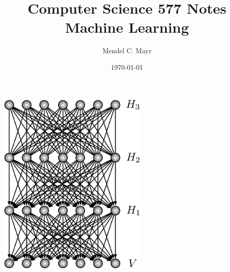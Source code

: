 \documentclass{article}
\title{Computer Science 577 Notes \\ Machine Learning}
\author{Mendel C. Mayr}
\date{\today}
\begin{document}
	\maketitle
	\vspace{10pt}
	\begin{center}
		\includegraphics[width = 2.9in]{ann.png}
		\end{center}
	\vspace{16pt}
	\tableofcontents
	\clearpage
\end{document}
